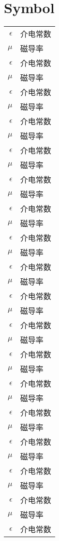 \chapter{Symbol}
\label{chap:symbols}

\begin{longtable}{rl}
$\epsilon$     & 介电常数 \\
 $\mu$ 		& 磁导率 \\
 $\epsilon$     & 介电常数 \\
 $\mu$ 		& 磁导率 \\
 $\epsilon$     & 介电常数 \\
 $\mu$ 		& 磁导率 \\
 $\epsilon$ 	& 介电常数 \\
 $\mu$ 		& 磁导率 \\
 $\epsilon$     & 介电常数 \\
 $\mu$ 		& 磁导率 \\
 $\epsilon$     & 介电常数 \\
 $\mu$ 		& 磁导率 \\
 $\epsilon$     & 介电常数 \\
 $\mu$ 		& 磁导率 \\
 $\epsilon$ 	& 介电常数 \\
 $\mu$ 		& 磁导率 \\
 $\epsilon$     & 介电常数 \\
 $\mu$ 		& 磁导率 \\
 $\epsilon$     & 介电常数 \\
 $\mu$ 		& 磁导率 \\
 $\epsilon$     & 介电常数 \\
 $\mu$ 		& 磁导率 \\
 $\epsilon$ 	& 介电常数 \\
 $\mu$ 		& 磁导率 \\
 $\epsilon$     & 介电常数 \\
 $\mu$ 		& 磁导率 \\
 $\epsilon$     & 介电常数 \\
 $\mu$ 		& 磁导率 \\
 $\epsilon$     & 介电常数 \\
 $\mu$ 		& 磁导率 \\
 $\epsilon$ 	& 介电常数 \\
 $\mu$ 		& 磁导率 \\
 $\epsilon$     & 介电常数 \\
 $\mu$ 		& 磁导率 \\
 $\epsilon$     & 介电常数 \\

\end{longtable}
